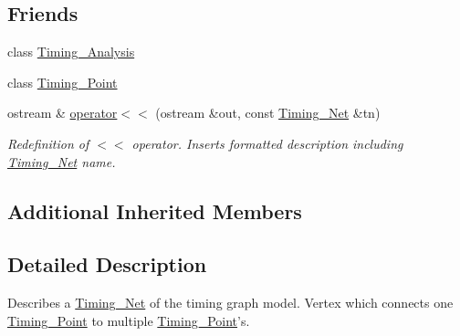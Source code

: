 \subsection*{Friends}
\begin{DoxyCompactItemize}
\item 
class \hyperlink{classTiming__Analysis_1_1Timing__Net_aab560f9cdcd55852a6a08a29a54a2b16}{Timing\-\_\-\-Analysis}
\item 
class \hyperlink{classTiming__Analysis_1_1Timing__Net_a2562d249ea959d9e392abdffe35cdbad}{Timing\-\_\-\-Point}
\item 
ostream \& \hyperlink{classTiming__Analysis_1_1Timing__Net_affa1b519dc847065ac579b4c8726c740}{operator$<$$<$} (ostream \&out, const \hyperlink{classTiming__Analysis_1_1Timing__Net}{Timing\-\_\-\-Net} \&tn)
\begin{DoxyCompactList}\small\item\em Redefinition of $<$$<$ operator. Inserts formatted description including \hyperlink{classTiming__Analysis_1_1Timing__Net}{Timing\-\_\-\-Net} name. \end{DoxyCompactList}\end{DoxyCompactItemize}
\subsection*{Additional Inherited Members}


\subsection{Detailed Description}
Describes a \hyperlink{classTiming__Analysis_1_1Timing__Net}{Timing\-\_\-\-Net} of the timing graph model. Vertex which connects one \hyperlink{classTiming__Analysis_1_1Timing__Point}{Timing\-\_\-\-Point} to multiple \hyperlink{classTiming__Analysis_1_1Timing__Point}{Timing\-\_\-\-Point}'s. 



